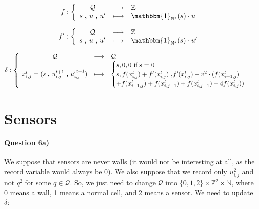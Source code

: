 \documentclass[a4paper,12pt]{article}
\begin{document}
\begin{eqnarray*}
f : \left \{ \begin{array}{c c l }
  \mathcal{Q} & \longrightarrow & \mathbb{Z} \\
  s \ \pmb{,} \ u\ \pmb{,} \ u' & \longmapsto & \mathbbm{1}_{\mathbb{N}^*}(s) \cdot u
  \end{array} \right .
\end{eqnarray*}


\begin{eqnarray*}
f' : \left \{ \begin{array}{c c l }
  \mathcal{Q} & \longrightarrow & \mathbb{Z} \\
  s \ \pmb{,} \ u\ \pmb{,} \ u' & \longmapsto & \mathbbm{1}_{\mathbb{N}^*}(s) \cdot u'
  \end{array} \right .
\end{eqnarray*}


\begin{eqnarray*}
\delta : \left \{ \begin{array}{c c l }
  \mathcal{Q} & \longrightarrow & \mathcal{Q} \\
  x_{i,j}^t = (s \ \pmb{,} \ u^{t+1}_{i,j}\ \pmb{,} \ u^{_{'} t+1}_{i,j}) & \longmapsto &
  \begin{cases}s, 0, 0\mbox{ if s = 0}\\
    s, f(x^{t}_{i,j}) + f'(x^t_{i,j})\ \pmb{,} f'(x^t_{i,j}) + v^2 \cdot (f(x^t_{i+1,j}) \\+ f(x^t_{i-1, j}) + f(x^t_{i, j+1}) + f(x^t_{i, j-1}) - 4 f(x^t_{i, j})) 
    \end{cases}\\
  \end{array} \right .
\end{eqnarray*}

\section{Sensors}

\paragraph{Question 6a)} We suppose that sensors are never walls (it would not be interesting at all, as the record variable would always be 0). We also suppose that we record only $u_{i,j}^2$ and not $q^2$ for some $q \in \mathcal{Q}$. So, we just need to change $\mathcal{Q}$ into $\{0,1,2\} \times \mathbb{Z}^2 \times \mathbb{N}$, where 0 means a wall, 1 means a normal cell, and 2 means a sensor. We need to update $\delta$:
\end{document}
